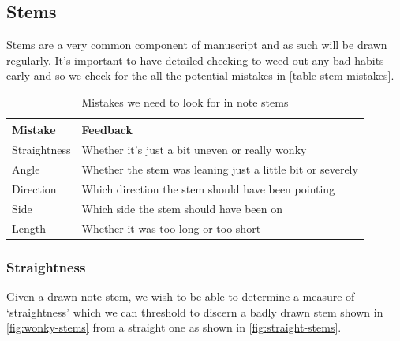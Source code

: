 \subsection{Stems}

Stems are a very common component of manuscript and as such will be drawn regularly. It's important to have detailed checking to weed out any bad habits early and so we check for the all the potential mistakes in \cref{table-stem-mistakes}.

\begin{table}[H]
    \renewcommand{\arraystretch}{1.6}
    \begin{tabularx}{\textwidth}{ lX }
        \toprule
        Mistake & Feedback \\
        \midrule
        Straightness & Whether it's just a bit uneven or really wonky \\
        Angle & Whether the stem was leaning just a little bit or severely \\
        Direction & Which direction the stem should have been pointing \\
        Side & Which side the stem should have been on \\
        Length & Whether it was too long or too short\\
        \bottomrule
    \end{tabularx}

    \caption{Mistakes we need to look for in note stems}
    \label{table:stem-mistakes}
\end{table}

\subsubsection{Straightness}

Given a drawn note stem, we wish to be able to determine a measure of `straightness' which we can threshold to discern a badly drawn stem shown in \cref{fig:wonky-stems} from a straight one  as shown in \cref{fig:straight-stems}.

